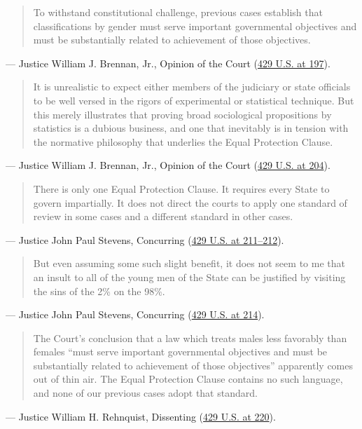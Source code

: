 \documentclass[12pt]{article}
\begin{document}
\begin{quote}
To withstand constitutional challenge, previous cases establish that classifications by gender must serve important governmental objectives and must be substantially related to achievement of those objectives.
\end{quote}
\noindent --- Justice William J. Brennan, Jr., Opinion of the Court (\href{https://supreme.justia.com/cases/federal/us/429/190/}{429 U.S. at 197}).

\begin{quote}
It is unrealistic to expect either members of the judiciary or state officials to be well versed in the rigors of experimental or statistical technique. But this merely illustrates that proving broad sociological propositions by statistics is a dubious business, and one that inevitably is in tension with the normative philosophy that underlies the Equal Protection Clause.
\end{quote}
\noindent --- Justice William J. Brennan, Jr., Opinion of the Court (\href{https://supreme.justia.com/cases/federal/us/429/190/}{429 U.S. at 204}).

\begin{quote}
There is only one Equal Protection Clause. It requires every State to govern impartially. It does not direct the courts to apply one standard of review in some cases and a different standard in other cases.
\end{quote}
\noindent --- Justice John Paul Stevens, Concurring (\href{https://supreme.justia.com/cases/federal/us/429/190/}{429 U.S. at 211--212}).

\begin{quote}
But even assuming some such slight benefit, it does not seem to me that an insult to all of the young men of the State can be justified by visiting the sins of the 2\% on the 98\%.
\end{quote}
\noindent --- Justice John Paul Stevens, Concurring (\href{https://supreme.justia.com/cases/federal/us/429/190/}{429 U.S. at 214}).

\begin{quote}
The Court's conclusion that a law which treats males less favorably than females ``must serve important governmental objectives and must be substantially related to achievement of those objectives'' apparently comes out of thin air. The Equal Protection Clause contains no such language, and none of our previous cases adopt that standard.
\end{quote}
\noindent --- Justice William H. Rehnquist, Dissenting (\href{https://supreme.justia.com/cases/federal/us/429/190/}{429 U.S. at 220}).
\end{document}
